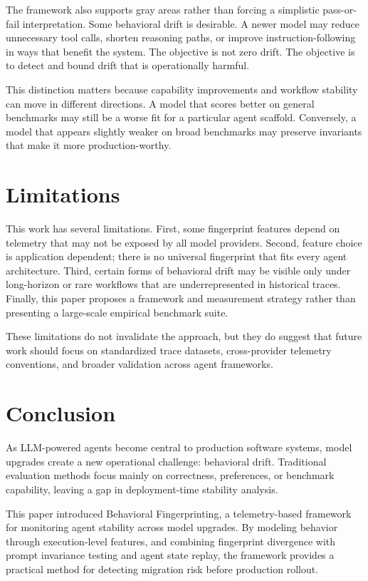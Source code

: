 \documentclass[11pt]{article}
\begin{document}
The framework also supports gray areas rather than forcing a simplistic pass-or-fail interpretation. Some behavioral drift is desirable. A newer model may reduce unnecessary tool calls, shorten reasoning paths, or improve instruction-following in ways that benefit the system. The objective is not zero drift. The objective is to detect and bound drift that is operationally harmful.

This distinction matters because capability improvements and workflow stability can move in different directions. A model that scores better on general benchmarks may still be a worse fit for a particular agent scaffold. Conversely, a model that appears slightly weaker on broad benchmarks may preserve invariants that make it more production-worthy.

\section{Limitations}
This work has several limitations. First, some fingerprint features depend on telemetry that may not be exposed by all model providers. Second, feature choice is application dependent; there is no universal fingerprint that fits every agent architecture. Third, certain forms of behavioral drift may be visible only under long-horizon or rare workflows that are underrepresented in historical traces. Finally, this paper proposes a framework and measurement strategy rather than presenting a large-scale empirical benchmark suite.

These limitations do not invalidate the approach, but they do suggest that future work should focus on standardized trace datasets, cross-provider telemetry conventions, and broader validation across agent frameworks.

\section{Conclusion}
As LLM-powered agents become central to production software systems, model upgrades create a new operational challenge: behavioral drift. Traditional evaluation methods focus mainly on correctness, preferences, or benchmark capability, leaving a gap in deployment-time stability analysis.

This paper introduced Behavioral Fingerprinting, a telemetry-based framework for monitoring agent stability across model upgrades. By modeling behavior through execution-level features, and combining fingerprint divergence with prompt invariance testing and agent state replay, the framework provides a practical method for detecting migration risk before production rollout.
\end{document}
